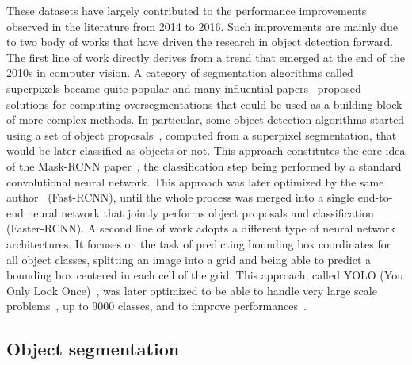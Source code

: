 These datasets have largely contributed to the performance improvements
observed in the literature from 2014 to 2016.
Such improvements are mainly due to two body of works
that have driven the research in object detection forward.
The first line of work directly derives from a trend that emerged
at the end of the 2010s in computer vision.
A category of segmentation algorithms called superpixels became quite popular and many
influential papers~\cite{felzenszwalb2004efficient, achanta2012slic, levinshtein2009turbopixels}
proposed solutions for computing oversegmentations that could be used
as a building block of more complex methods.
In particular, some object detection algorithms started using
a set of object proposals~\cite{uijlings2013selective},
computed from a superpixel segmentation,
that would be later classified as objects or not.
This approach constitutes the core idea of the Mask-RCNN paper~\cite{girshick2014maskrcnn},
the classification step being performed by a standard convolutional neural network.
This approach was later optimized by
the same author~\cite{girshick2015fastrcnn} (Fast-RCNN),
until the whole process was merged into a single end-to-end neural network that jointly
performs object proposals and classification~\cite{ren2015faster} (Faster-RCNN).
A second line of work adopts a different type of neural network architectures.
It focuses on the task of predicting bounding box coordinates for all object classes,
splitting an image into a grid and being able
to predict a bounding box centered in each cell of the grid.
This approach, called YOLO (You Only Look Once)~\cite{redmon2016you},
was later optimized to be able to handle
very large scale problems~\cite{redmon2017yolo9000}, up to 9000 classes,
and to improve performances~\cite{redmon2018yolov3}.

\subsection{Object segmentation}

